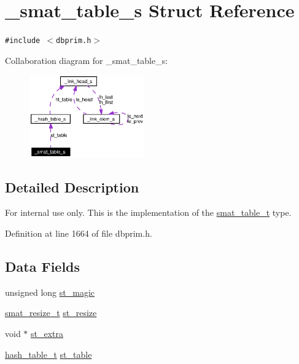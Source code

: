 \hypertarget{struct__smat__table__s}{
\section{\_\-smat\_\-table\_\-s Struct Reference}
\label{struct__smat__table__s}
}
{\tt \#include $<$dbprim.h$>$}

Collaboration diagram for \_\-smat\_\-table\_\-s:\begin{figure}[H]
\begin{center}
\leavevmode
\includegraphics[width=140pt]{struct__smat__table__s__coll__graph}
\end{center}
\end{figure}


\subsection{Detailed Description}
\begin{Desc}
\item[For internal use only.]
This is the implementation of the \hyperlink{group__dbprim__smat_ga0}{smat\_\-table\_\-t} type.\end{Desc}




Definition at line 1664 of file dbprim.h.\subsection*{Data Fields}
\begin{CompactItemize}
\item 
unsigned long \hyperlink{struct__smat__table__s_o0}{st\_\-magic}
\item 
\hyperlink{group__dbprim__smat_ga3}{smat\_\-resize\_\-t} \hyperlink{struct__smat__table__s_o1}{st\_\-resize}
\item 
void $\ast$ \hyperlink{struct__smat__table__s_o2}{st\_\-extra}
\item 
\hyperlink{struct__hash__table__s}{hash\_\-table\_\-t} \hyperlink{struct__smat__table__s_o3}{st\_\-table}
\end{CompactItemize}


